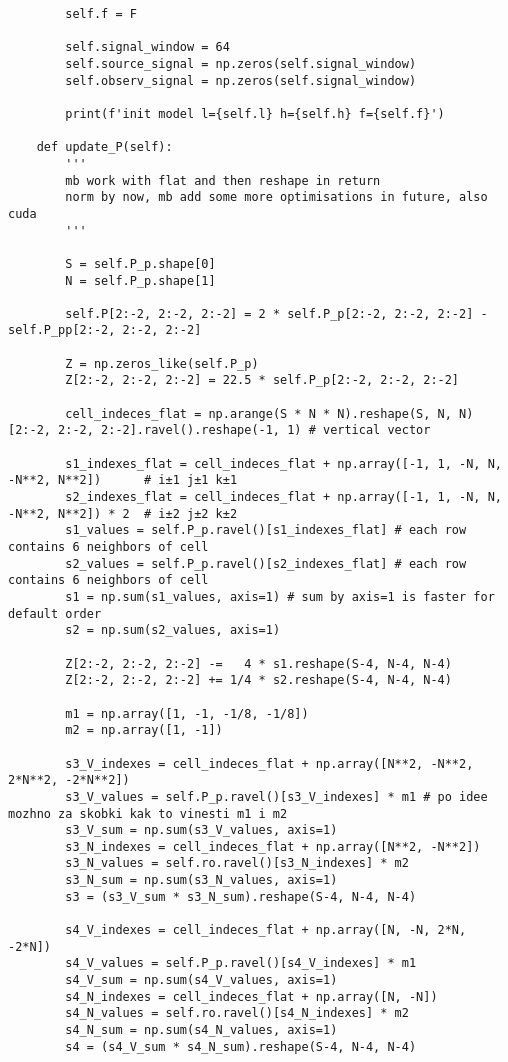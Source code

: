 \documentclass[../main.tex]{subfiles}
\begin{document}
\begin{lstlisting}
        self.f = F

        self.signal_window = 64
        self.source_signal = np.zeros(self.signal_window)
        self.observ_signal = np.zeros(self.signal_window)
        
        print(f'init model l={self.l} h={self.h} f={self.f}')

    def update_P(self):
        '''
        mb work with flat and then reshape in return
        norm by now, mb add some more optimisations in future, also cuda
        '''

        S = self.P_p.shape[0]
        N = self.P_p.shape[1]

        self.P[2:-2, 2:-2, 2:-2] = 2 * self.P_p[2:-2, 2:-2, 2:-2] - self.P_pp[2:-2, 2:-2, 2:-2]

        Z = np.zeros_like(self.P_p)
        Z[2:-2, 2:-2, 2:-2] = 22.5 * self.P_p[2:-2, 2:-2, 2:-2]
        
        cell_indeces_flat = np.arange(S * N * N).reshape(S, N, N)[2:-2, 2:-2, 2:-2].ravel().reshape(-1, 1) # vertical vector

        s1_indexes_flat = cell_indeces_flat + np.array([-1, 1, -N, N, -N**2, N**2])      # i±1 j±1 k±1 
        s2_indexes_flat = cell_indeces_flat + np.array([-1, 1, -N, N, -N**2, N**2]) * 2  # i±2 j±2 k±2 
        s1_values = self.P_p.ravel()[s1_indexes_flat] # each row contains 6 neighbors of cell 
        s2_values = self.P_p.ravel()[s2_indexes_flat] # each row contains 6 neighbors of cell 
        s1 = np.sum(s1_values, axis=1) # sum by axis=1 is faster for default order
        s2 = np.sum(s2_values, axis=1)

        Z[2:-2, 2:-2, 2:-2] -=   4 * s1.reshape(S-4, N-4, N-4)
        Z[2:-2, 2:-2, 2:-2] += 1/4 * s2.reshape(S-4, N-4, N-4)

        m1 = np.array([1, -1, -1/8, -1/8])
        m2 = np.array([1, -1])

        s3_V_indexes = cell_indeces_flat + np.array([N**2, -N**2, 2*N**2, -2*N**2])
        s3_V_values = self.P_p.ravel()[s3_V_indexes] * m1 # po idee mozhno za skobki kak to vinesti m1 i m2
        s3_V_sum = np.sum(s3_V_values, axis=1)
        s3_N_indexes = cell_indeces_flat + np.array([N**2, -N**2])
        s3_N_values = self.ro.ravel()[s3_N_indexes] * m2
        s3_N_sum = np.sum(s3_N_values, axis=1)
        s3 = (s3_V_sum * s3_N_sum).reshape(S-4, N-4, N-4)
        
        s4_V_indexes = cell_indeces_flat + np.array([N, -N, 2*N, -2*N])
        s4_V_values = self.P_p.ravel()[s4_V_indexes] * m1
        s4_V_sum = np.sum(s4_V_values, axis=1)
        s4_N_indexes = cell_indeces_flat + np.array([N, -N])
        s4_N_values = self.ro.ravel()[s4_N_indexes] * m2
        s4_N_sum = np.sum(s4_N_values, axis=1)
        s4 = (s4_V_sum * s4_N_sum).reshape(S-4, N-4, N-4)


\end{lstlisting}
\end{document}
